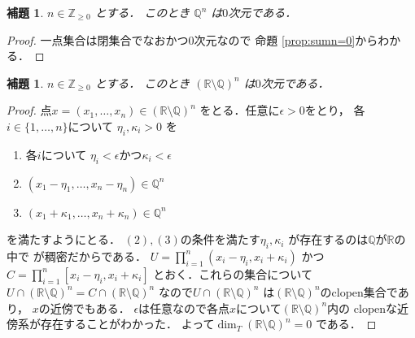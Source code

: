 \documentclass[leqno, a4paper, 12pt]{jsarticle}
\newtheorem{lem}[thm]{補題}
\newcommand{\zz}{\mathbb{Z}}
\newcommand{\qq}{\mathbb{Q}}
\newcommand{\rr}{\mathbb{R}}
\begin{document}
\begin{lem}\label{lem:qq00}
$n\in \zz_{\ge 0}$
とする．
このとき
$\qq^{n}$
は$0$次元である．
\end{lem}
\begin{proof}
一点集合は閉集合でなおかつ$0$次元なので
命題 \ref{prop:sumn=0}からわかる．
\end{proof}


\begin{lem}\label{lem:pp00}
$n\in \zz_{\ge 0}$
とする．
このとき
$(\rr\setminus \qq)^{n}$
は$0$次元である．
\end{lem}
\begin{proof}
点$x=(x_{1}, \dots, x_{n})\in (\rr\setminus \qq)^{n}$
をとる．任意に$\epsilon >0$をとり，
各$i\in \{1, \dots, n\}$について
$\eta_{i}, \kappa_{i}>0$
を
\begin{enumerate}
\item 各$i$について
$\eta_{i}<\epsilon$かつ$\kappa_{i}<\epsilon$
\item $(x_{1}-\eta_{1}, \dots, x_{n}-\eta_{n})\in \qq^{n}$
\item $(x_{1}+\kappa_{1}, \dots, x_{n}+\kappa_{n})\in \qq^{n}$
\end{enumerate}
を満たすようにとる．
$(2), (3)$の条件を満たす$\eta_{i}, \kappa_{i}$
が存在するのは$\qq$が$\rr$の中で
が稠密だからである．
$U=\prod_{i=1}^{n}(x_{i}-\eta_{i}, x_{i}+\kappa_{i})$
かつ
$C=\prod_{i=1}^{n}[x_{i}-\eta_{i}, x_{i}+\kappa_{i}]$
とおく．これらの集合について
$U\cap(\rr\setminus \qq)^{n}=C\cap (\rr\setminus \qq)^{n}$
なので$U\cap(\rr\setminus \qq)^{n}$
は$(\rr\setminus \qq)^{n}$のclopen集合であり，
$x$の近傍でもある．
$\epsilon$は任意なので各点$x$について$(\rr\setminus \qq)^{n}$内の
clopenな近傍系が存在することがわかった．
よって$\dim_{T}(\rr\setminus \qq)^{n}=0$
である．
\end{proof}
\end{document}
